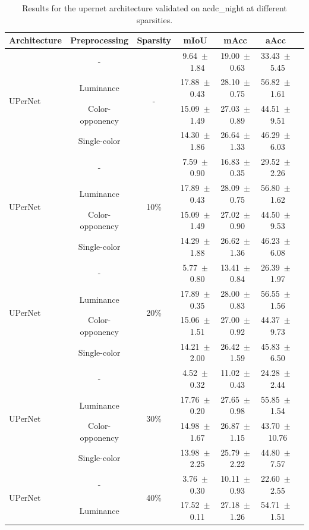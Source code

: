 \begin{table}[h]
\centering
\caption{Results for the upernet architecture validated on acdc_night at different sparsities.}
\begin{tabular}{@{}lccc ccc@{}}
\toprule
Architecture & Preprocessing & Sparsity & mIoU & mAcc & aAcc \\
\midrule

\multirow{4}{*}{UPerNet} & - & \multirow{4}{*}{-} & 9.64~$\pm$~1.84 & 19.00~$\pm$~0.63 & 33.43~$\pm$~5.45 \\
& Luminance & & 17.88~$\pm$~0.43 & 28.10~$\pm$~0.75 & 56.82~$\pm$~1.61 \\
& Color-opponency & & 15.09~$\pm$~1.49 & 27.03~$\pm$~0.89 & 44.51~$\pm$~9.51 \\
& Single-color & & 14.30~$\pm$~1.86 & 26.64~$\pm$~1.33 & 46.29~$\pm$~6.03 \\
\midrule
\multirow{4}{*}{UPerNet} & - & \multirow{4}{*}{10\%} & 7.59~$\pm$~0.90 & 16.83~$\pm$~0.35 & 29.52~$\pm$~2.26 \\
& Luminance & & 17.89~$\pm$~0.43 & 28.09~$\pm$~0.75 & 56.80~$\pm$~1.62 \\
& Color-opponency & & 15.09~$\pm$~1.49 & 27.02~$\pm$~0.90 & 44.50~$\pm$~9.53 \\
& Single-color & & 14.29~$\pm$~1.88 & 26.62~$\pm$~1.36 & 46.23~$\pm$~6.08 \\
\midrule
\multirow{4}{*}{UPerNet} & - & \multirow{4}{*}{20\%} & 5.77~$\pm$~0.80 & 13.41~$\pm$~0.84 & 26.39~$\pm$~1.97 \\
& Luminance & & 17.89~$\pm$~0.35 & 28.00~$\pm$~0.83 & 56.55~$\pm$~1.56 \\
& Color-opponency & & 15.06~$\pm$~1.51 & 27.00~$\pm$~0.92 & 44.37~$\pm$~9.73 \\
& Single-color & & 14.21~$\pm$~2.00 & 26.42~$\pm$~1.59 & 45.83~$\pm$~6.50 \\
\midrule
\multirow{4}{*}{UPerNet} & - & \multirow{4}{*}{30\%} & 4.52~$\pm$~0.32 & 11.02~$\pm$~0.43 & 24.28~$\pm$~2.44 \\
& Luminance & & 17.76~$\pm$~0.20 & 27.65~$\pm$~0.98 & 55.85~$\pm$~1.54 \\
& Color-opponency & & 14.98~$\pm$~1.67 & 26.87~$\pm$~1.15 & 43.70~$\pm$~10.76 \\
& Single-color & & 13.98~$\pm$~2.25 & 25.79~$\pm$~2.22 & 44.80~$\pm$~7.57 \\
\midrule
\multirow{4}{*}{UPerNet} & - & \multirow{4}{*}{40\%} & 3.76~$\pm$~0.30 & 10.11~$\pm$~0.93 & 22.60~$\pm$~2.55 \\
& Luminance & & 17.52~$\pm$~0.11 & 27.18~$\pm$~1.26 & 54.71~$\pm$~1.51 \\

\end{tabular}
\end{table}
